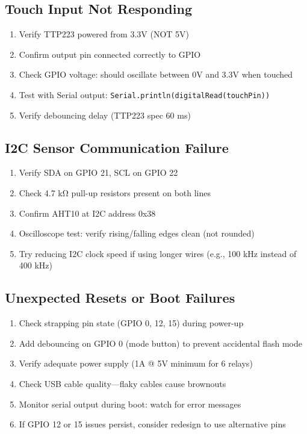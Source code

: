 \subsection{Touch Input Not Responding}

\begin{enumerate}
    \item Verify TTP223 powered from 3.3V (NOT 5V)
    \item Confirm output pin connected correctly to GPIO
    \item Check GPIO voltage: should oscillate between 0V and 3.3V when touched
    \item Test with Serial output: \texttt{Serial.println(digitalRead(touchPin))}
    \item Verify debouncing delay (TTP223 spec 60 ms)
\end{enumerate}

\subsection{I2C Sensor Communication Failure}

\begin{enumerate}
    \item Verify SDA on GPIO 21, SCL on GPIO 22
    \item Check 4.7 kΩ pull-up resistors present on both lines
    \item Confirm AHT10 at I2C address 0x38
    \item Oscilloscope test: verify rising/falling edges clean (not rounded)
    \item Try reducing I2C clock speed if using longer wires (e.g., 100 kHz instead of 400 kHz)
\end{enumerate}

\subsection{Unexpected Resets or Boot Failures}

\begin{enumerate}
    \item Check strapping pin state (GPIO 0, 12, 15) during power-up
    \item Add debouncing on GPIO 0 (mode button) to prevent accidental flash mode
    \item Verify adequate power supply (1A @ 5V minimum for 6 relays)
    \item Check USB cable quality—flaky cables cause brownouts
    \item Monitor serial output during boot: watch for error messages
    \item If GPIO 12 or 15 issues persist, consider redesign to use alternative pins
\end{enumerate}

